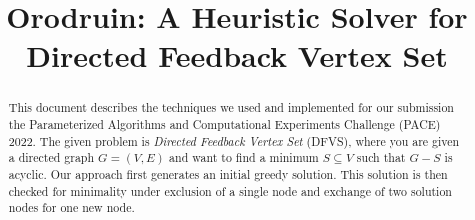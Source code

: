 \documentclass[a4paper,USenglish,cleveref, autoref, thm-restate, authorcolumns]{template/lipics-v2021}
\title{Orodruin: A Heuristic Solver for Directed Feedback Vertex Set} %
\begin{document}
\maketitle

\begin{abstract}
This document describes the techniques we used and implemented for our submission the Parameterized Algorithms and Computational Experiments Challenge (PACE) 2022. The given problem is \emph{Directed Feedback Vertex Set} (DFVS), where you are given a directed graph $G=(V,E)$ and want to find a minimum $S\subseteq V$ such that $G-S$ is acyclic.
Our approach first generates an initial greedy solution. This solution is then checked for minimality under exclusion of a single node and exchange of two solution nodes for one new node.
\end{abstract}










\appendix
\end{document}
